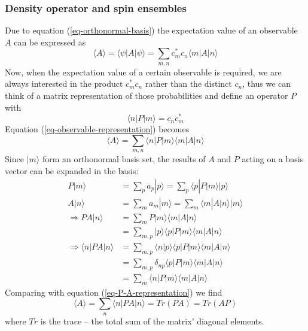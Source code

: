 \documentclass[11.5pt,a4paper]{article}
\begin{document}
\subsubsection{Density operator and spin ensembles}
Due to equation (\ref{eq-orthonormal-basis}) the expectation value of an observable $A$ can be expressed as 
\begin{equation}
 \langle A \rangle = \langle \psi | A | \psi \rangle = \sum_{m,n} c_m^* c_n \langle m | A | n \rangle
  \label{eq-observable-representation}
\end{equation}
Now, when the expectation value of a certain observable is required, we are always interested in the product $c_m^* c_n$ rather than the distinct $c_n$, thus we can think of a matrix representation of those probabilities and define an operator $P$ with
\begin{equation}
 \langle n | P | m \rangle = c_n c_m^*
\end{equation}
Equation (\ref{eq-observable-representation}) becomes
\begin{equation}
 \langle A \rangle = \sum_{m,n} \langle n | P | m \rangle \langle m | A | n \rangle
  \label{eq-P-A-representation}
\end{equation}
Since $|m\rangle$ form an orthonormal basis set, the results of $A$ and $P$ acting on a basis vector can be expanded in the basis:
\begin{align}
 P|m\rangle & = \sum_p a_p |p\rangle = \sum_p \langle p | P | m \rangle | p \rangle\\
 A|n\rangle & = \sum_m a_m |m\rangle = \sum_m \langle m | A | n \rangle | m \rangle\\
 \Rightarrow P A |n\rangle & = \sum_m P|m\rangle \langle m | A | n \rangle \\
  & = \sum_{m,p} |p\rangle \langle p | P | m \rangle \langle m | A | n \rangle \\
  \Rightarrow \langle n | P A | n \rangle & = \sum_{m,p} \langle n|p\rangle \langle p | P | m \rangle \langle m | A | n \rangle \\
  & = \sum_{m,p} \delta_{np} \langle p | P | m \rangle \langle m | A | n \rangle \\
  & = \sum_{m} \langle n | P | m \rangle \langle m | A | n \rangle
\end{align}
Comparing with equation (\ref{eq-P-A-representation}) we find
\begin{equation}
 \langle A \rangle = \sum_n \langle n | P A | n \rangle = Tr(P A) = Tr(A P)
 \label{eq-A-P-trace}
\end{equation}
where $Tr$ is the trace -- the total sum of the matrix' diagonal elements.
\end{document}
